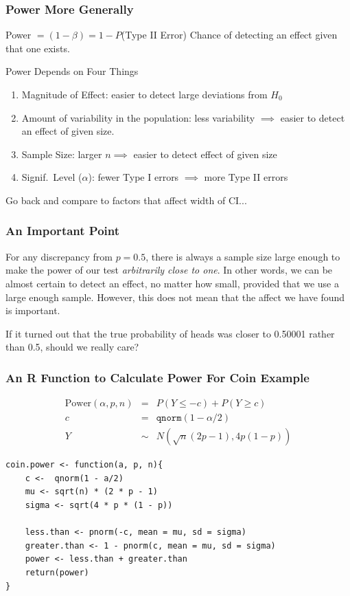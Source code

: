 \documentclass[handout]{beamer}
\begin{document}

\begin{frame}
\frametitle{Power More Generally}
	\begin{block}{Power $ = (1 - \beta) = 1 -  P$(Type II Error)}
Chance of detecting an effect given that one exists.
\end{block}
\begin{block}{Power Depends on Four Things}
	\begin{enumerate}
\item Magnitude of Effect: easier to detect large deviations from $H_0$
\item Amount of variability in the population: less variability $\implies$ easier to detect an effect of given size.
\item Sample Size: larger $n \implies$ easier to detect effect of given size
\item Signif.\ Level ($\alpha$): fewer Type I errors $\implies$ more Type II errors
\end{enumerate}
\end{block}
\alert{Go back and compare to factors that affect width of CI...}
\end{frame}
\begin{frame}
\frametitle{An Important Point}
For any discrepancy from $p = 0.5$, there is always a sample size large enough to make the power of our test \emph{arbitrarily close to one}. In other words, we can be almost certain to detect an effect, no matter how small, provided that we use a large enough sample. \alert{However, this does not mean that the affect we have found is important}.

\vspace{2em}
If it turned out that the true probability of heads was closer to 0.50001 rather than 0.5, should we really care? 
\end{frame}
\begin{frame}[fragile]
\frametitle{An R Function to Calculate Power For Coin Example}
\footnotesize
	\begin{eqnarray*}
		\mbox{Power}(\alpha, p, n) &=& P\left(Y \leq -c\right) + P\left(Y\geq c\right)\\
			 c &=&\texttt{qnorm}(1 - \alpha/2) \\
			 Y &\sim& N\left(\sqrt{n}(2p-1), 4 p(1-p)  \right)
		 \end{eqnarray*} 

\begin{verbatim}
coin.power <- function(a, p, n){
    c <-  qnorm(1 - a/2)	
    mu <- sqrt(n) * (2 * p - 1) 	
    sigma <- sqrt(4 * p * (1 - p))
    
    less.than <- pnorm(-c, mean = mu, sd = sigma)
    greater.than <- 1 - pnorm(c, mean = mu, sd = sigma)
    power <- less.than + greater.than
    return(power)
}
\end{verbatim}
\end{frame}
\end{document}
